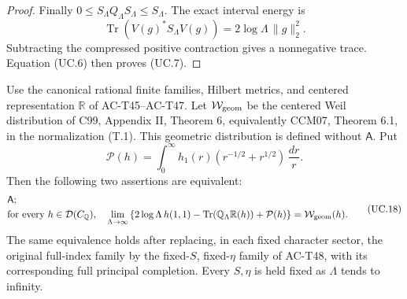 \begin{proof}
Finally \(0\leq S_\Lambda Q_\Lambda S_\Lambda\leq S_\Lambda\).
The exact interval energy is
\[
         \operatorname{Tr}(V(g)^*S_\Lambda V(g))
                       =2\log\Lambda\,\|g\|_2^2 .
 \tag{UC.16}
\]
Subtracting the compressed positive contraction gives
a nonnegative trace.  Equation (UC.6) then proves (UC.7).
\end{proof}

\begin{theorem}
\label{AC-T51}
Use the canonical rational finite families, Hilbert metrics,
and centered representation \(\mathbb R\) of
AC-T45--AC-T47.  Let \(\mathcal W_{\rm geom}\) be the
centered Weil distribution of C99, Appendix II, Theorem 6,
equivalently CCM07, Theorem 6.1, in the normalization (T.1).
This geometric distribution is defined without \(\mathsf A\).
Put
\[
       \mathcal P(h)=\int_0^\infty h_1(r)
                           (r^{-1/2}+r^{1/2})\,\frac{dr}{r}.
 \tag{UC.17}
\]
Then the following two assertions are equivalent:
\[
 \begin{split}
 &\mathsf A;\\
 &\text{for every }h\in\mathcal D(C_{\mathbb Q}),\quad
 \lim_{\Lambda\to\infty}
 \left\{2\log\Lambda\,h(1,1)
       -\operatorname{Tr}(\mathbb Q_\Lambda\mathbb R(h))
       +\mathcal P(h)\right\}
                         =\mathcal W_{\rm geom}(h).
 \end{split}
 \tag{UC.18}
\]
The same equivalence holds after replacing, in each fixed
character sector, the original full-index family by the
fixed-\(S\), fixed-\(\eta\) family of AC-T48, with its
corresponding full principal completion.
Every \(S,\eta\) is held fixed as \(\Lambda\) tends to infinity.
\end{theorem}
